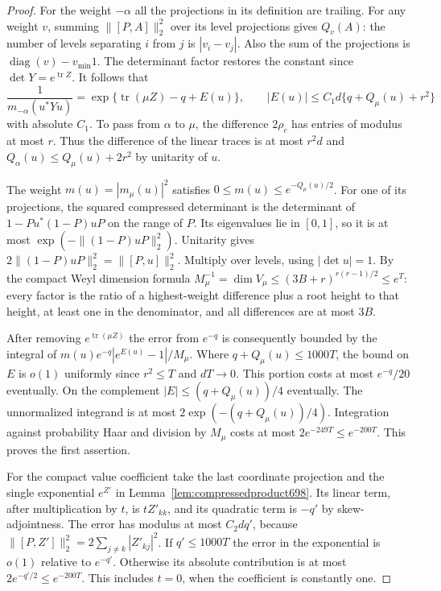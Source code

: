 \documentclass[a4paper,11pt]{article}
\theoremstyle{definition}
\theoremstyle{remark}
\numberwithin{equation}{section}
\begin{document}
\begin{proof}
For the weight \(-\alpha\) all the projections in its
definition are trailing. For any weight \(v\), summing
\(\|[P,A]\|_2^2\) over its level projections gives \(Q_v(A)\):
the number of levels separating \(i\) from \(j\) is
\(|v_i-v_j|\). Also the sum of the projections is
\(\operatorname{diag}(v)-v_{\min}1\).
The determinant factor restores the constant since
\(\det Y=e^{\operatorname{tr} Z}\). It follows that
\[
 \frac{1}{m_{-\alpha}(u^*Yu)}
     =\exp\{\operatorname{tr}(\mu Z)-q+E(u)\},\qquad
 |E(u)|\le C_1 d\{q+Q_\mu(u)+r^2\}
\]
with absolute \(C_1\). To pass from \(\alpha\) to \(\mu\),
the difference \(2\rho_c\) has entries of modulus at most
\(r\). Thus the difference of the linear traces is at most
\(r^2d\) and \(Q_\alpha(u)\le Q_\mu(u)+2r^2\) by unitarity
of \(u\).

The weight \(m(u)=|m_\mu(u)|^2\) satisfies
\(0\le m(u)\le e^{-Q_\mu(u)/2}\). For one of its projections,
the squared compressed determinant is the determinant of
\(1-Pu^*(1-P)uP\) on the range of \(P\). Its eigenvalues
lie in \([0,1]\), so it is at most
\(\exp(-\|(1-P)uP\|_2^2)\). Unitarity gives
\(2\|(1-P)uP\|_2^2=\|[P,u]\|_2^2\). Multiply over levels,
using \(|\det u|=1\). By the compact Weyl dimension formula
\(M_\mu^{-1}=\dim V_\mu\le (3B+r)^{r(r-1)/2}\le e^T\):
every factor is the ratio of a highest-weight difference
plus a root height to that height, at least one in the
denominator, and all differences are at most \(3B\).

After removing \(e^{\operatorname{tr}(\mu Z)}\) the error
from \(e^{-q}\) is consequently bounded by the integral of
\(m(u)e^{-q}|e^{E(u)}-1|/M_\mu\). Where
\(q+Q_\mu(u)\le1000T\), the bound on \(E\) is \(o(1)\)
uniformly since \(r^2\le T\) and \(dT\to0\). This portion
costs at most \(e^{-q}/20\) eventually. On the complement
\(|E|\le(q+Q_\mu(u))/4\) eventually. The unnormalized
integrand is at most \(2\exp(-(q+Q_\mu(u))/4)\).
Integration against probability Haar and division by
\(M_\mu\) costs at most \(2e^{-249T}\le e^{-200T}\).
This proves the first assertion.

For the compact value coefficient take the last coordinate
projection and the single exponential \(e^{Z'}\) in
Lemma~\ref{lem:compressedproduct698}. Its linear term,
after multiplication by \(t\), is \(tZ'_{kk}\), and its
quadratic term is \(-q'\) by skew-adjointness. The error
has modulus at most \(C_2d q'\), because
\(\|[P,Z']\|_2^2=2\sum_{j\ne k}|Z'_{kj}|^2\). If
\(q'\le1000T\) the error in the exponential is \(o(1)\)
relative to \(e^{-q'}\). Otherwise its absolute contribution
is at most \(2e^{-q'/2}\le e^{-200T}\). This includes
\(t=0\), when the coefficient is constantly one.
\end{proof}
\end{document}
